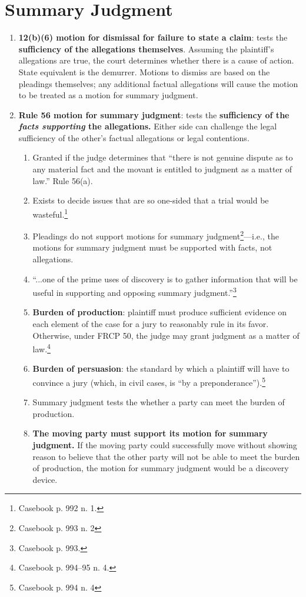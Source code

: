 \section{Summary Judgment}

\begin{enumerate}
    \item \textbf{12(b)(6) motion for dismissal for failure to state a claim}: 
    tests the \textbf{sufficiency of the allegations themselves}. Assuming the 
    plaintiff's allegations are true, the court determines whether there is a 
    cause of action. State equivalent is the demurrer. Motions to dismiss are 
    based on the pleadings themselves; any additional factual allegations will 
    cause the motion to be treated as a motion for summary judgment.
    \item \textbf{Rule 56 motion for summary judgment}: tests the 
    \textbf{sufficiency of the \emph{facts supporting} the allegations.} 
    Either side can challenge the legal sufficiency of the other's factual 
    allegations or legal contentions.
    \begin{enumerate}
        \item Granted if the judge determines that ``there is not genuine 
        dispute as to any material fact and the movant is entitled to judgment 
        as a matter of law.'' Rule 56(a).
        \item Exists to decide issues that are so one-sided that a trial would 
        be wasteful.\footnote{Casebook p. 992 n. 1.}
        \item Pleadings do not support motions for summary 
        judgment\footnote{Casebook p. 993 n. 2}---i.e., the motions for 
        summary judgment must be supported with facts, not allegations.
        \item ``...one of the prime uses of discovery is to gather information 
        that will be useful in supporting and opposing summary 
        judgment.''\footnote{Casebook p. 993.}
        \item \textbf{Burden of production}: plaintiff must produce sufficient 
        evidence on each element of the case for a jury to reasonably rule in 
        its favor. Otherwise, under FRCP 50, the judge may grant judgment as a 
        matter of law.\footnote{Casebook p. 994--95 n. 4.}
        \item \textbf{Burden of persuasion}: the standard by which a plaintiff 
        will have to convince a jury (which, in civil cases, is ``by a 
        preponderance'').\footnote{Casebook p. 994 n. 4}
        \item Summary judgment tests the whether a party can meet the burden 
        of production.
        \item \textbf{The moving party must support its motion for summary 
        judgment.} If the moving party could successfully move without showing 
        reason to believe that the other party will not be able to meet the 
        burden of production, the motion for summary judgment would be a 
        discovery device.
    \end{enumerate}
\end{enumerate}

